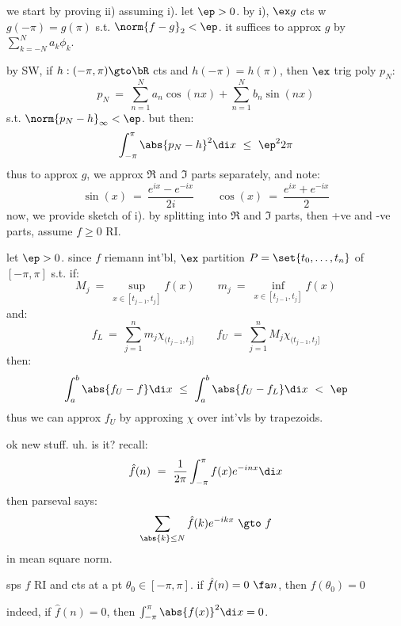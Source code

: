 \begin{pf}
	we start by proving ii) assuming i).
	let $\ep>0$. by i), $\ex g$ cts w $g(-\pi)=g(\pi)$ s.t. $\norm{f-g}_{2}<\ep$.
	it suffices to approx $g$ by $\sum_{k=-N}^{N}a_{k}\phi_{k}$.

	by SW, if $h:(-\pi,\pi)\gto\bR$ cts and $h(-\pi)=h(\pi)$, then
	$\ex$ trig poly $p_{N}$:
	\begin{equation*}
		p_{N} \ = \ \sum_{n=1}^{N}a_{n}\cos(nx) + \sum_{n=1}^{N}b_{n}\sin(nx)
	\end{equation*}
	s.t. $\norm{p_{N}-h}_{\infty}<\ep$.
	but then:
	\begin{equation*}
		\int_{-\pi}^{\pi}\abs{p_{N}-h}^{2}\di x \ \leq \ \ep^{2}2\pi
	\end{equation*}
	thus to approx $g$, we approx $\Re$ and $\Im$ parts separately, and note:
	\begin{equation*}
		\sin(x) \ = \ \frac{e^{ix}-e^{-ix}}{2i} \qquad
		\cos(x) \ = \ \frac{e^{ix}+e^{-ix}}{2}
	\end{equation*}
	now, we provide sketch of i).
	by splitting into $\Re$ and $\Im$ parts, then +ve and -ve parts,
	assume $f\geq0$ RI.

	let $\ep>0$.
	since $f$ riemann int'bl, $\ex$ partition $P=\set{t_{0},\dots,t_{n}}$ of $[-\pi,\pi]$ s.t. if:
	\begin{equation*}
		M_{j} \ = \ \sup_{x\in[t_{j-1},t_{j}]}f(x) \qquad
		m_{j} \ = \ \inf_{x\in[t_{j-1},t_{j}]}f(x)
	\end{equation*}
	and:
	\begin{equation*}
		f_{L} \ = \ \sum_{j=1}^{n}m_{j}\chi_{(t_{j-1},t_{j}]} \qquad
		f_{U} \ = \ \sum_{j=1}^{n}M_{j}\chi_{(t_{j-1},t_{j}]}
	\end{equation*}
	then:
	\begin{equation*}
		\int_{a}^{b}\abs{f_{U}-f}\di x \ \leq \ \int_{a}^{b}\abs{f_{U}-f_{L}}\di x \ < \ \ep
	\end{equation*}
	thus we can approx $f_{U}$ by approxing $\chi$ over int'vls by trapezoids.
\end{pf}
ok new stuff. uh. is it? recall:
\begin{equation*}
	\hat{f}(n) \ = \ \frac{1}{2\pi}\int_{-\pi}^{\pi}f(x)e^{-inx}\di x
\end{equation*}
then parseval says:
\begin{equation*}
	\sum_{\abs{k}\leq N}\hat{f}(k)e^{-ikx} \ \gto \ f
\end{equation*}
in mean square norm.

\begin{thm}
	sps $f$ RI and cts at a pt $\theta_{0}\in[-\pi,\pi]$.
	if $\hat{f}(n)=0 \ \fa n$, then $f(\theta_{0})=0$
\end{thm}
indeed, if $\hat{f}(n)=0$, then $\int_{-\pi}^{\pi}\abs{f(x)}^{2}\di x = 0$.

